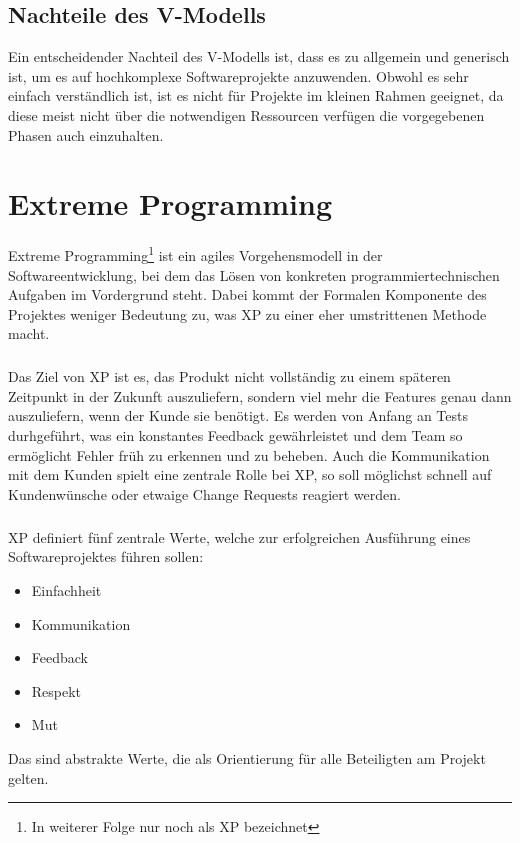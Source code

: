 \documentclass[a4paper, twopage]{scrreprt}
\begin{document}
\section{Nachteile des V-Modells}
\label{sec:vmodell_nachteile}
Ein entscheidender Nachteil des V-Modells ist, dass es zu allgemein und generisch ist, um es auf hochkomplexe Softwareprojekte anzuwenden. Obwohl es sehr einfach verständlich ist, ist es nicht für Projekte im kleinen Rahmen geeignet, da diese meist nicht über die notwendigen Ressourcen verfügen die vorgegebenen Phasen auch einzuhalten.


\chapter{Extreme Programming}
\label{ch:extremeprogramming}
Extreme Programming\footnote{In weiterer Folge nur noch als XP bezeichnet} ist ein agiles Vorgehensmodell in der Softwareentwicklung, bei dem das Lösen von konkreten programmiertechnischen Aufgaben im Vordergrund steht. Dabei kommt der Formalen Komponente des Projektes weniger Bedeutung zu, was XP zu einer eher umstrittenen Methode macht.
\paragraph*{}
Das Ziel von XP ist es, das Produkt nicht vollständig zu einem späteren Zeitpunkt in der Zukunft auszuliefern, sondern viel mehr die Features genau dann auszuliefern, wenn der Kunde sie benötigt. Es werden von Anfang an Tests durhgeführt, was ein konstantes Feedback gewährleistet und dem Team so ermöglicht Fehler früh zu erkennen und zu beheben. Auch die Kommunikation mit dem Kunden spielt eine zentrale Rolle bei XP, so soll möglichst schnell auf Kundenwünsche oder etwaige Change Requests reagiert werden.
\paragraph*{}
XP definiert fünf zentrale Werte, welche zur erfolgreichen Ausführung eines Softwareprojektes führen sollen:
\begin{itemize}
	\item Einfachheit
	\item Kommunikation
	\item Feedback
	\item Respekt
	\item Mut
\end{itemize}
Das sind abstrakte Werte, die als Orientierung für alle Beteiligten am Projekt gelten.
\end{document}
